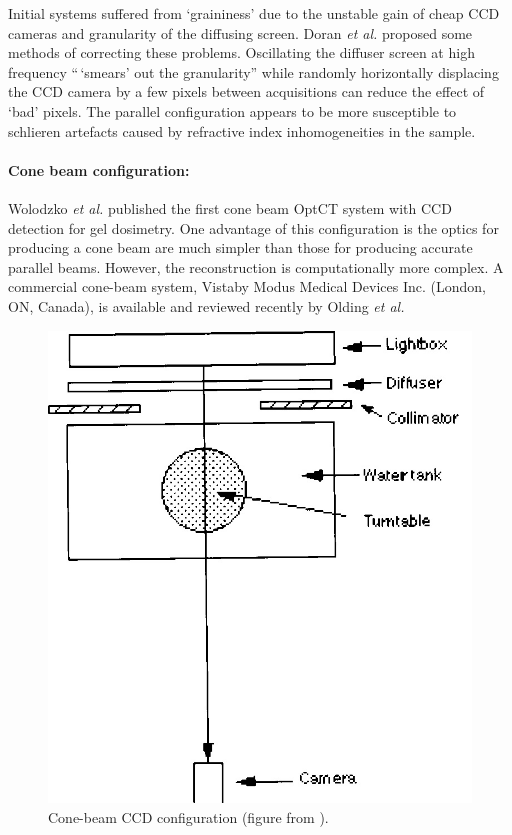 \documentclass[12pt]{article}
\begin{document}
Initial systems  suffered from `graininess' due to the unstable gain of cheap CCD cameras and granularity of the diffusing screen. \cite{Doran:2001ee}   Doran \textit{et al.} proposed some methods of correcting these problems. Oscillating the diffuser screen at high frequency 
``\,`smears' out the granularity'' while randomly horizontally displacing the CCD camera by a few pixels  between acquisitions can reduce the effect of `bad'  pixels.
 \cite{Doran:2001ee}
 The parallel configuration appears to be more susceptible to schlieren artefacts caused by refractive index inhomogeneities in the sample. \cite{Krstajic:2007hk}






\paragraph{Cone beam configuration:}
Wolodzko \textit{et al.} published the first cone beam OptCT system with CCD detection for gel dosimetry.\cite{Wolodzko:1999} One advantage of this configuration is the optics for producing a cone beam are much simpler than those for producing accurate parallel beams. \cite{Doran:2008kh} However, the reconstruction is computationally more complex. \cite{hsieh2003computed} A commercial cone-beam system, Vista\texttrademark by Modus Medical Devices Inc. (London, ON, Canada),  is available and reviewed recently by Olding \textit{et al.} \cite{Olding:2011eta}


\begin{figure}[H]
\centering
\includegraphics[scale=0.3]{Wolodzko_1999_conesetup.jpg}
\caption{Cone-beam CCD configuration (figure from \cite{Wolodzko:1999}).}
\end{figure}
\end{document}

